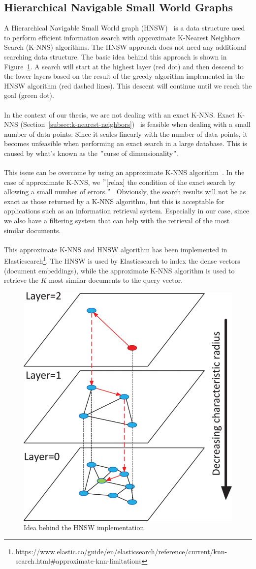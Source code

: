 \subsection{Hierarchical Navigable Small World Graphs}\label{subsec:hierarchical-navigable-small-world-graphs}
A Hierarchical Navigable Small World graph (HNSW)~\cite{malkov_efficient_2020} is a data structure used to perform efficient information search with approximate K-Nearest Neighbors Search (K-NNS) algorithms.
The HNSW approach does not need any additional searching data structure.
The basic idea behind this approach is shown in Figure~\ref{fig:hnsw}.
A search will start at the highest layer (red dot) and then descend to the lower layers based on the result of the greedy algorithm implemented in the HNSW algorithm (red dashed lines).
This descent will continue until we reach the goal (green dot). \\ \\
In the context of our thesis, we are not dealing with an exact K-NNS\@.
Exact K-NNS (Section~\ref{subsec:k-nearest-neighbors})~\cite{navarro_searching_2002, tellez_singleton_2016} is feasible when dealing with a small number of data points.
Since it scales linearly with the number of data points, it becomes unfeasible when performing an exact search in a large database.
This is caused by what's known as the \("\)curse of dimensionality\("\). \\ \\
This issue can be overcome by using an approximate K-NNS algorithm~\cite{muja_scalable_2014, houle_rank-based_2015}.
In the case of approximate K-NNS, we \("\)[relax] the condition of the exact search by allowing a small number of errors.\("\)~\cite{malkov_efficient_2020}
Obviously, the search results will not be as exact as those returned by a K-NNS algorithm, but this is acceptable for applications such as an information retrieval system.
Especially in our case, since we also have a filtering system that can help with the retrieval of the most similar documents. \\ \\
This approximate K-NNS and HNSW algorithm has been implemented in Elasticsearch\footnote{https://www.elastic.co/guide/en/elasticsearch/reference/current/knn-search.html\#approximate-knn-limitations}.
The HNSW is used by Elasticsearch to index the dense vectors (document embeddings), while the approximate K-NNS algorithm is used to retrieve the $K$ most similar documents to the query vector.

\begin{figure}[!h]
    \begin{center}
        \includegraphics[width=0.3\linewidth]{assets/png/background/hnsw}
    \end{center}

    \caption{Idea behind the HNSW implementation~\cite{malkov_efficient_2020}}
    \label{fig:hnsw}
\end{figure}

